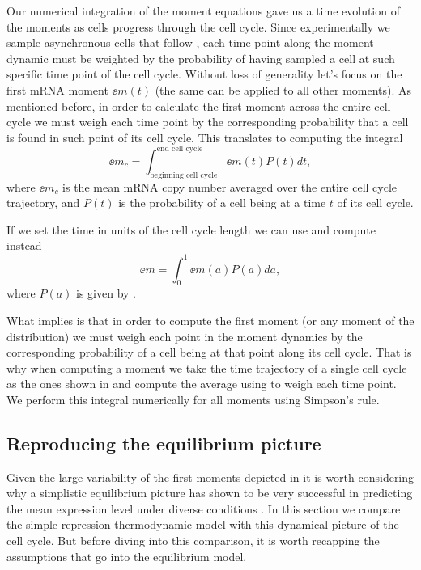 Our numerical integration of the moment equations gave us a time evolution of
the moments as cells progress through the cell cycle. Since experimentally we
sample asynchronous cells that follow , each time point
along the moment dynamic must be weighted by the probability of having sampled
a cell at such specific time point of the cell cycle. Without loss of
generality let's focus on the first mRNA moment $\ee{m(t)}$ (the same can be
applied to all other moments). As mentioned before, in order to calculate the
first moment across the entire cell cycle we must weigh each time point by the
corresponding probability that a cell is found in such point of its cell cycle.
This translates to computing the integral
\begin{equation}
  \ee{m}_c = \int_{\text{beginning cell cycle}}^{\text{end cell cycle}}
                       \ee{m(t)} P(t) dt,
\end{equation}
where $\ee{m}_c$ is the mean mRNA copy number averaged over the entire cell
cycle trajectory, and $P(t)$ is the probability of a cell being at a time $t$ of
its cell cycle.

If we set the time in units of the cell cycle length we can use
 and compute instead
\begin{equation}
  \ee{m} = \int_0^1 \ee{m(a)} P(a) da,
  \label{seq_moment_avg}
\end{equation}
where $P(a)$ is given by .

What  implies is that in order to compute the first moment
(or any moment of the distribution) we must weigh each point in the moment
dynamics by the corresponding probability of a cell being at that point along
its cell cycle. That is why when computing a moment we take the time trajectory
of a single cell cycle as the ones shown in  and
compute the average using  to weigh each time point. We
perform this integral numerically for all moments using Simpson's rule.

\subsection{Reproducing the equilibrium picture}

Given the large variability of the first moments depicted in
 it is worth considering why a simplistic
equilibrium picture has shown to be very successful in predicting the mean
expression level under diverse conditions \cite{Garcia2011c, Brewster2014,
Barnes2019, Razo-Mejia2018}. In this section we compare the simple repression
thermodynamic model with this dynamical picture of the cell cycle. But before
diving into this comparison, it is worth recapping the assumptions that go into
the equilibrium model.

